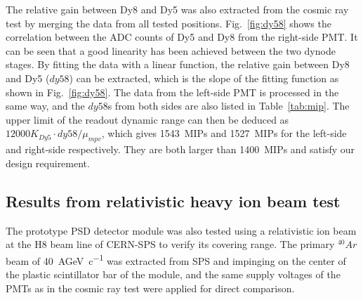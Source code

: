 \documentclass[preprint, times]{elsarticle}
\begin{document}
The relative gain between Dy8 and Dy5 was also extracted from the cosmic ray test by merging the data from all tested positions.
Fig.~\ref{fig:dy58} shows the correlation between the ADC counts of Dy5 and Dy8 from the right-side PMT.
It can be seen that a good linearity has been achieved between the two dynode stages.
By fitting the data with a linear function, the relative gain between Dy8 and Dy5 ($dy58$) can be extracted, which is the slope of the fitting function as shown in Fig.~\ref{fig:dy58}.
The data from the left-side PMT is processed in the same way, and the $dy58$s from both sides are also listed in Table~\ref{tab:mip}.
The upper limit of the readout dynamic range can then be deduced as $12000K_{Dy5} \cdot dy58/\mu_{mpv}$, which gives \SI{1543}{MIPs} and \SI{1527}{MIPs} for the left-side and right-side respectively.
They are both larger than \SI{1400}{MIPs} and satisfy our design requirement.


\subsection{Results from relativistic heavy ion beam test}
\label{sec:beam}
The prototype PSD detector module was also tested using a relativistic ion beam at the H8 beam line of CERN-SPS to verify its covering range.
The primary $^{40}{Ar}$ beam of \SI{40}{AGeV\per c} was extracted from SPS and impinging on the center of the plastic scintillator bar of the module, and the same supply voltages of the PMTs as in the cosmic ray test were applied for direct comparison.
\end{document}
